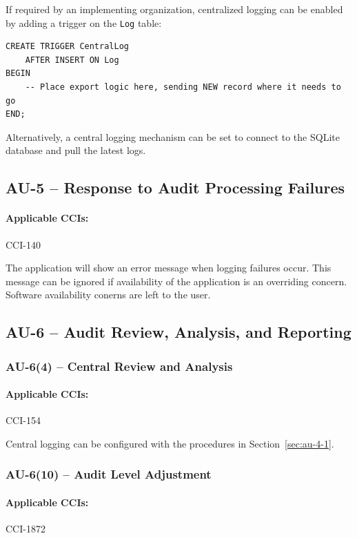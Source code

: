 \documentclass[letterpaper, 10pt, twoside]{article}
\begin{document}
If required by an implementing organization, centralized logging can be enabled by adding a trigger on the \texttt{Log} table:

\begin{lstlisting}[style=SqlStyle]
CREATE TRIGGER CentralLog 
	AFTER INSERT ON Log
BEGIN
	-- Place export logic here, sending NEW record where it needs to go
END;
\end{lstlisting}

Alternatively, a central logging mechanism can be set to connect to the SQLite database and pull the latest logs.

\subsection{AU-5 -- Response to Audit Processing Failures}

\paragraph{Applicable CCIs:} CCI-140

The application will show an error message when logging failures occur. This message can be ignored if availability of the application is an overriding concern. Software availability conerns are left to the user.

\subsection{AU-6 -- Audit Review, Analysis, and Reporting}

\subsubsection{AU-6(4) -- Central Review and Analysis}

\paragraph{Applicable CCIs:} CCI-154

Central logging can be configured with the procedures in Section~\ref{sec:au-4-1}.

\subsubsection{AU-6(10) -- Audit Level Adjustment}

\paragraph{Applicable CCIs:} CCI-1872
\end{document}
